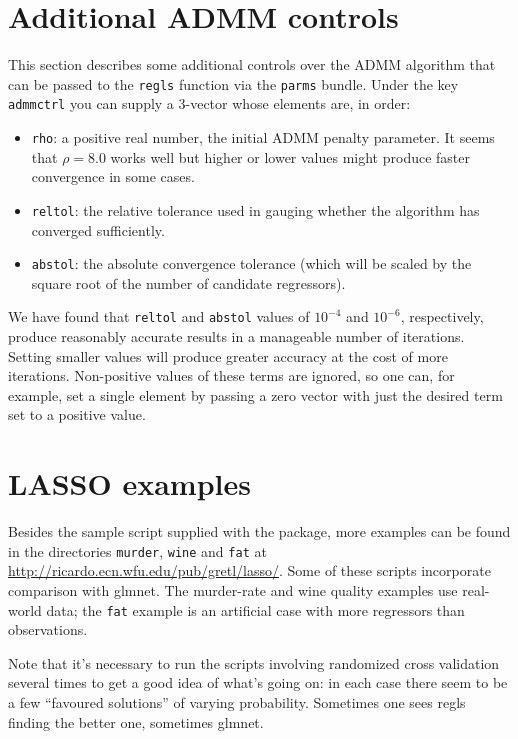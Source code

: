 \documentclass{article}
\begin{document}
\section{Additional ADMM controls}
\label{sec:add-controls}

This section describes some additional controls over the ADMM
algorithm that can be passed to the \texttt{regls} function via the
\texttt{parms} bundle. Under the key \texttt{admmctrl} you can supply
a 3-vector whose elements are, in order:
\begin{itemize}
\item \texttt{rho}: a positive real number, the initial ADMM penalty
  parameter. It seems that $\rho = 8.0$ works well but higher or lower
  values might produce faster convergence in some cases.
\item \texttt{reltol}: the relative tolerance used in gauging whether
  the algorithm has converged sufficiently.
\item \texttt{abstol}: the absolute convergence tolerance (which will
  be scaled by the square root of the number of candidate regressors).
\end{itemize}
We have found that \texttt{reltol} and \texttt{abstol} values of
$10^{-4}$ and $10^{-6}$, respectively, produce reasonably accurate
results in a manageable number of iterations. Setting smaller values
will produce greater accuracy at the cost of more iterations.
Non-positive values of these terms are ignored, so one can, for
example, set a single element by passing a zero vector with just the
desired term set to a positive value.

\section{LASSO examples}
\label{sec:examples}

Besides the sample script supplied with the package, more examples can
be found in the directories \texttt{murder}, \texttt{wine} and
\texttt{fat} at \url{http://ricardo.ecn.wfu.edu/pub/gretl/lasso/}.
Some of these scripts incorporate comparison with \textsf{glmnet}.
The murder-rate and wine quality examples use real-world data; the
\texttt{fat} example is an artificial case with more regressors than
observations.

Note that it's necessary to run the scripts involving randomized cross
validation several times to get a good idea of what's going on: in
each case there seem to be a few ``favoured solutions'' of varying
probability. Sometimes one sees \textsf{regls} finding the better one,
sometimes \textsf{glmnet}.
\end{document}
